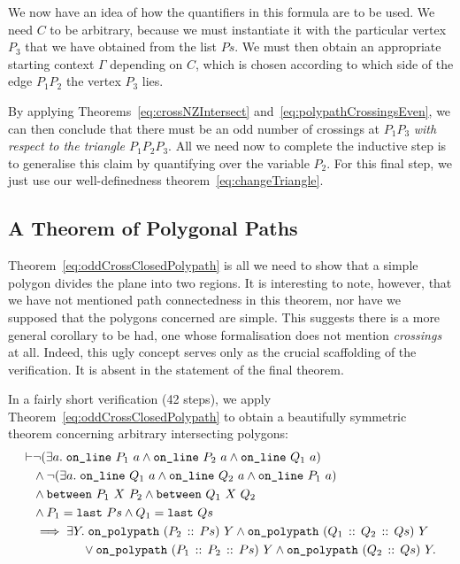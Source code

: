 We now have an idea of how the quantifiers in this formula are to be used. We need $C$ to be arbitrary, because we must instantiate it with the particular vertex $P_3$ that we have obtained from the list $Ps$. We must then obtain an appropriate starting context $\Gamma$ depending on $C$, which is chosen according to which side of the edge $P_1P_2$ the vertex $P_3$ lies. 

By applying Theorems~\ref{eq:crossNZIntersect} and~\ref{eq:polypathCrossingsEven}, we can then conclude that there must be an odd number of crossings at $P_1P_3$ \emph{with respect to the triangle $P_1P_2P_3$}. All we need now to complete the inductive step is to generalise this claim by quantifying over the variable $P_2$. For this final step, we just use our well-definedness theorem~\eqref{eq:changeTriangle}.

\subsection{A Theorem of Polygonal Paths}\label{sec:PathTheorem}
Theorem~\ref{eq:oddCrossClosedPolypath} is all we need to show that a simple polygon divides the plane into two regions. It is interesting to note, however, that we have not mentioned path connectedness in this theorem, nor have we supposed that the polygons concerned are simple. This suggests there is a more general corollary to be had, one whose formalisation does not mention \emph{crossings} at all. Indeed, this ugly concept serves only as the crucial scaffolding of the verification. It is absent in the statement of the final theorem.

In a fairly short verification (42 steps), we apply Theorem~\ref{eq:oddCrossClosedPolypath} to obtain a beautifully symmetric theorem concerning arbitrary intersecting polygons:
\begin{equation}\label{eq:intersectPolypathClosed}
  \begin{aligned}
    \vdash&\neg(\exists a.\; \texttt{on\_line}\ P_1\ a\wedge \texttt{on\_line}\ P_2\ a\wedge \texttt{on\_line}\ Q_1\ a)\\
    &\wedge\neg(\exists a.\; \texttt{on\_line}\ Q_1\ a\wedge \texttt{on\_line}\ Q_2\ a\wedge \texttt{on\_line}\ P_1\ a)\\
    &\wedge\texttt{between}\ P_1\ X\ P_2 \wedge \texttt{between}\ Q_1\ X\ Q_2\\
    &\wedge P_1 = \texttt{last}\ Ps \wedge Q_1 = \texttt{last}\ Qs\\
    &\implies \exists Y.\; \texttt{on\_polypath}\ (P_2\,::\,Ps)\ Y \wedge \texttt{on\_polypath}\ (Q_1\,::\,Q_2\,::\,Qs)\ Y\\
    &\qquad\qquad\vee \texttt{on\_polypath}\ (P_1\,::\,P_2\,::\,Ps)\ Y \wedge \texttt{on\_polypath}\ (Q_2\,::\,Qs)\ Y.
  \end{aligned}
\end{equation}

